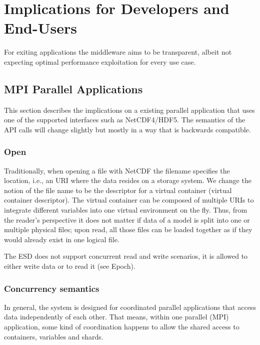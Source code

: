 \documentclass{../../template/esiwace-report}
\begin{document}
\section{Implications for Developers and End-Users}

For exiting applications the middleware aims to be transparent, albeit not expecting optimal performance exploitation for every use case.


\subsection{MPI Parallel Applications}

This section describes the implications on a existing parallel application that uses one of the supported interfaces such as NetCDF4/HDF5.
The semantics of the API calls will change slightly but mostly in a way that is backwards compatible.

\subsubsection{Open}

Traditionally, when opening a file with NetCDF the filename specifies the location, i.e., an URI where the data resides on a storage system.
We change the notion of the file name to be the descriptor for a virtual container (virtual container descriptor).
The virtual container can be composed of multiple URIs to integrate different variables into one virtual environment on the fly.
Thus, from the reader's perspective it does not matter if data of a model is split into one or multiple physical files; upon read, all those files can be loaded together as if they would already exist in one logical file.

The ESD does not support concurrent read and write scenarios, it is allowed to either write data or to read it (see Epoch).



\subsubsection{Concurrency semantics}

In general, the system is designed for coordinated parallel applications that access data independently of each other.
That means, within one parallel (MPI) application, some kind of coordination happens to allow the shared access to containers, variables and shards.
\end{document}
